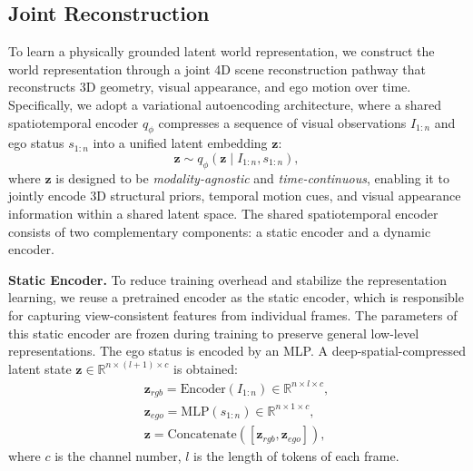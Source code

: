 
\subsection{Joint Reconstruction}
\label{recon}
To learn a physically grounded latent world representation, we construct the world representation through a joint 4D scene reconstruction pathway that reconstructs 3D geometry, visual appearance, and ego motion over time. Specifically, we adopt a variational autoencoding architecture, where a shared spatiotemporal encoder $q_\phi$ compresses a sequence of visual observations $I_{1:n}$ and ego status $s_{1:n}$ into a unified latent embedding $\mathbf{z}$:
\begin{equation}
    \mathbf{z} \sim q_\phi(\mathbf{z}\mid I_{1:n}, s_{1:n}),
\end{equation}
where $\mathbf{z}$ is designed to be \textit{modality-agnostic} and \textit{time-continuous}, enabling it to jointly encode 3D structural priors, temporal motion cues, and visual appearance information within a shared latent space. The shared spatiotemporal encoder consists of two complementary components: a static encoder and a dynamic encoder. 

\noindent\textbf{Static Encoder.} To reduce training overhead and stabilize the representation learning, we reuse a pretrained encoder \cite{dcae, dinov3} as the static encoder, which is responsible for capturing view-consistent features from individual frames. The parameters of this static encoder are frozen during training to preserve general low-level representations. The ego status is encoded by an MLP. A deep-spatial-compressed latent state $\textbf{z}\in \mathbb{R}^{n\times (l+1) \times c}$ is obtained:
\begin{equation}
    \begin{aligned}
     \textbf{z}_{rgb} = \text{Encoder}(I_{1:n}) \in \mathbb{R}^{n\times l \times c}, \\
     \textbf{z}_{ego} = \text{MLP}(s_{1:n}) \in \mathbb{R}^{n\times 1 \times c}, \\
     \textbf{z} = \text{Concatenate}([\textbf{z}_{rgb},\textbf{z}_{ego}]),
    \end{aligned}
    \label{Eq:s_encoder}
\end{equation}
\noindent where $c$ is the channel number, $l$ is the length of tokens of each frame.

